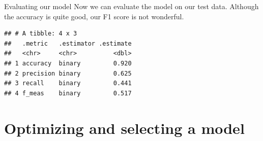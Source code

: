 \documentclass[
  10pt,
  ignorenonframetext,
  aspectratio=169]{beamer}
\newenvironment{Shaded}{\begin{snugshade}}{\end{snugshade}}
\newcommand{\AttributeTok}[1]{\textcolor[rgb]{0.80,0.80,0.80}{#1}}
\newcommand{\FunctionTok}[1]{\textcolor[rgb]{0.94,0.94,0.56}{#1}}
\newcommand{\NormalTok}[1]{\textcolor[rgb]{0.80,0.80,0.80}{#1}}
\newcommand{\OtherTok}[1]{\textcolor[rgb]{0.94,0.94,0.56}{#1}}
\newcommand{\SpecialCharTok}[1]{\textcolor[rgb]{0.86,0.64,0.64}{#1}}
\newcommand{\StringTok}[1]{\textcolor[rgb]{0.80,0.58,0.58}{#1}}
\begin{document}
\begin{frame}[fragile]{Evaluating our model}
\protect\hypertarget{evaluating-our-model-1}{}
Now we can evaluate the model on our test data. Although the accuracy is
quite good, our F1 score is not wonderful.

\medskip
\scriptsize

\begin{Shaded}
\end{Shaded}

\begin{verbatim}
## # A tibble: 4 x 3
##   .metric   .estimator .estimate
##   <chr>     <chr>          <dbl>
## 1 accuracy  binary         0.920
## 2 precision binary         0.625
## 3 recall    binary         0.441
## 4 f_meas    binary         0.517
\end{verbatim}
\end{frame}

\hypertarget{optimizing-and-selecting-a-model}{%
\section{Optimizing and selecting a
model}\label{optimizing-and-selecting-a-model}}
\end{document}
